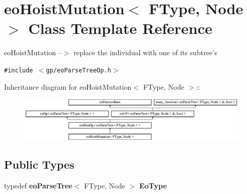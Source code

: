 \section{eo\-Hoist\-Mutation$<$ FType, Node $>$ Class Template Reference}
\label{classeo_hoist_mutation}
eo\-Hoist\-Mutation --$>$ replace the individual with one of its subtree's  


{\tt \#include $<$gp/eo\-Parse\-Tree\-Op.h$>$}

Inheritance diagram for eo\-Hoist\-Mutation$<$ FType, Node $>$::\begin{figure}[H]
\begin{center}
\leavevmode
\includegraphics[height=2.14559cm]{classeo_hoist_mutation}
\end{center}
\end{figure}
\subsection*{Public Types}
\begin{CompactItemize}
\item 
typedef {\bf eo\-Parse\-Tree}$<$ FType, Node $>$ {\bf Eo\-Type}\label{classeo_hoist_mutation_w0}

\end{CompactItemize}
